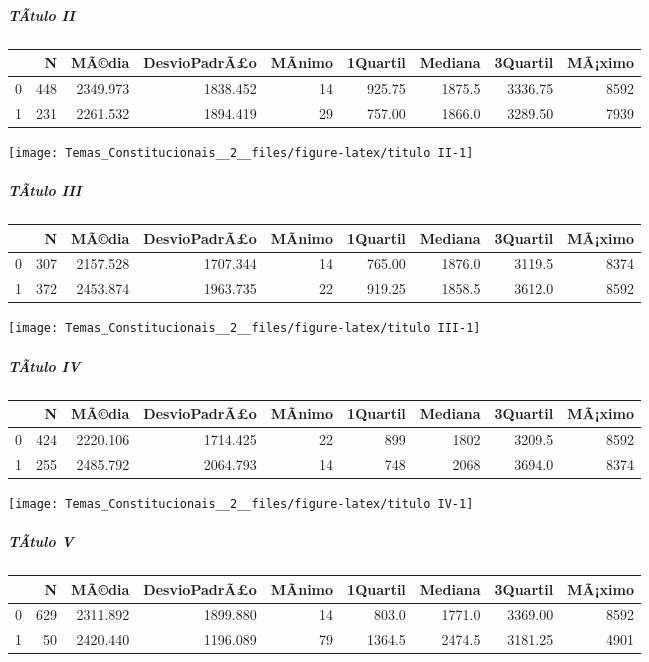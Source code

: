 \documentclass[]{article}
\let\oldsubparagraph\subparagraph
\renewcommand{\subparagraph}[1]{\oldsubparagraph{#1}\mbox{}}
\begin{document}
\subparagraph{TÃ­tulo II}\label{tatulo-ii}

\begin{longtable}[]{@{}lrrrrrrrr@{}}
\toprule
& N & MÃ©dia & DesvioPadrÃ£o & MÃ­nimo & 1Quartil & Mediana & 3Quartil &
MÃ¡ximo\tabularnewline
\midrule
\endhead
0 & 448 & 2349.973 & 1838.452 & 14 & 925.75 & 1875.5 & 3336.75 &
8592\tabularnewline
1 & 231 & 2261.532 & 1894.419 & 29 & 757.00 & 1866.0 & 3289.50 &
7939\tabularnewline
\bottomrule
\end{longtable}

\begin{center}\texttt{[image: Temas\_Constitucionais\_\_2\_\_files/figure-latex/titulo II-1]} \end{center}

\subparagraph{TÃ­tulo III}\label{tatulo-iii}

\begin{longtable}[]{@{}lrrrrrrrr@{}}
\toprule
& N & MÃ©dia & DesvioPadrÃ£o & MÃ­nimo & 1Quartil & Mediana & 3Quartil &
MÃ¡ximo\tabularnewline
\midrule
\endhead
0 & 307 & 2157.528 & 1707.344 & 14 & 765.00 & 1876.0 & 3119.5 &
8374\tabularnewline
1 & 372 & 2453.874 & 1963.735 & 22 & 919.25 & 1858.5 & 3612.0 &
8592\tabularnewline
\bottomrule
\end{longtable}

\begin{center}\texttt{[image: Temas\_Constitucionais\_\_2\_\_files/figure-latex/titulo III-1]} \end{center}

\subparagraph{TÃ­tulo IV}\label{tatulo-iv}

\begin{longtable}[]{@{}lrrrrrrrr@{}}
\toprule
& N & MÃ©dia & DesvioPadrÃ£o & MÃ­nimo & 1Quartil & Mediana & 3Quartil &
MÃ¡ximo\tabularnewline
\midrule
\endhead
0 & 424 & 2220.106 & 1714.425 & 22 & 899 & 1802 & 3209.5 &
8592\tabularnewline
1 & 255 & 2485.792 & 2064.793 & 14 & 748 & 2068 & 3694.0 &
8374\tabularnewline
\bottomrule
\end{longtable}

\begin{center}\texttt{[image: Temas\_Constitucionais\_\_2\_\_files/figure-latex/titulo IV-1]} \end{center}

\subparagraph{TÃ­tulo V}\label{tatulo-v}

\begin{longtable}[]{@{}lrrrrrrrr@{}}
\toprule
& N & MÃ©dia & DesvioPadrÃ£o & MÃ­nimo & 1Quartil & Mediana & 3Quartil &
MÃ¡ximo\tabularnewline
\midrule
\endhead
0 & 629 & 2311.892 & 1899.880 & 14 & 803.0 & 1771.0 & 3369.00 &
8592\tabularnewline
1 & 50 & 2420.440 & 1196.089 & 79 & 1364.5 & 2474.5 & 3181.25 &
4901\tabularnewline
\bottomrule
\end{longtable}
\end{document}
